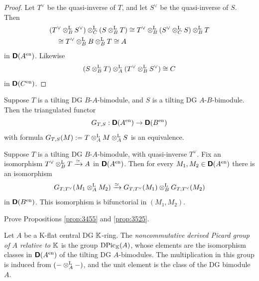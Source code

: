 \begin{proof}
Let $T^{\vee}$ be the quasi-inverse of $T$, and let 
$S^{\vee}$ be the quasi-inverse of $S$. Then
\[ \begin{aligned}
& (T^{\vee} \otimes^{\mathrm{L}}_{B} S^{\vee}) \otimes^{\mathrm{L}}_{C} 
(S \otimes^{\mathrm{L}}_{B} T) \cong 
T^{\vee} \otimes^{\mathrm{L}}_{B} (S^{\vee} \otimes^{\mathrm{L}}_{C} S )\otimes^{\mathrm{L}}_{B} T
\\ & \quad 
\cong T^{\vee} \otimes^{\mathrm{L}}_{B} B \otimes^{\mathrm{L}}_{B} T \cong A 
\end{aligned} \]
in $\boldsymbol{\mathsf{D}}(A^{\mathrm{en}})$. Likewise 
\[ (S \otimes^{\mathrm{L}}_{B} T) \otimes^{\mathrm{L}}_{A} 
(T^{\vee} \otimes^{\mathrm{L}}_{B} S^{\vee}) \cong C \]
in $\boldsymbol{\mathsf{D}}(C^{\mathrm{en}})$. 
\end{proof}

\begin{prop} \label{prop:3455}
Suppose $T$ is a tilting DG $B$-$A$-bimodule, and 
$S$ is a tilting DG $A$-$B$-bimodule. Then the triangulated functor 
\[ G_{T, S} : \boldsymbol{\mathsf{D}}(A^{\mathrm{en}}) \to \boldsymbol{\mathsf{D}}(B^{\mathrm{en}}) \]
with formula
$G_{T, S}(M) := T \otimes^{\mathrm{L}}_{A} M \otimes^{\mathrm{L}}_{A} S$ 
is an equivalence. 
\end{prop}

\begin{prop} \label{prop:3525}
Suppose $T$ is a tilting DG $B$-$A$-bimodule, with quasi-inverse 
$T^{\vee}$. Fix an isomorphism 
$T^{\vee} \otimes^{\mathrm{L}}_{B} T \xrightarrow{\simeq} A$
in $\boldsymbol{\mathsf{D}}(A^{\mathrm{en}})$. 
Then for every $M_1, M_2 \in \boldsymbol{\mathsf{D}}(A^{\mathrm{en}})$ there is an  
isomorphism 
\[ G_{T, T^{\vee}} (M_1 \otimes^{\mathrm{L}}_{A} M_2) \xrightarrow{\simeq} 
G_{T, T^{\vee}} (M_1) \otimes^{\mathrm{L}}_{B} G_{T, T^{\vee}} (M_2) \]
in $\boldsymbol{\mathsf{D}}(B^{\mathrm{en}})$. This isomorphism is bifunctorial in
$(M_1, M_2)$. 
\end{prop}

\begin{exer} \label{exer:3590}
Prove Propositions \ref{prop:3455} and \ref{prop:3525}.
\end{exer}

\begin{dfn} \label{dfn:3457}
Let $A$ be a K-flat central DG $\mathbb{K}$-ring. The 
{\em noncommutative derived Picard group of $A$ relative to $\mathbb{K}$} 
is the group $\operatorname{DPic}_{\mathbb{K}}(A)$, whose 
elements are the isomorphism classes in $\boldsymbol{\mathsf{D}}(A^{\mathrm{en}})$ of the 
tilting DG $A$-bimodules. The multiplication in this group is induced from 
$(- \otimes^{\mathrm{L}}_{A} -)$, and the unit element is the class of the DG bimodule 
$A$. 
\end{dfn}

